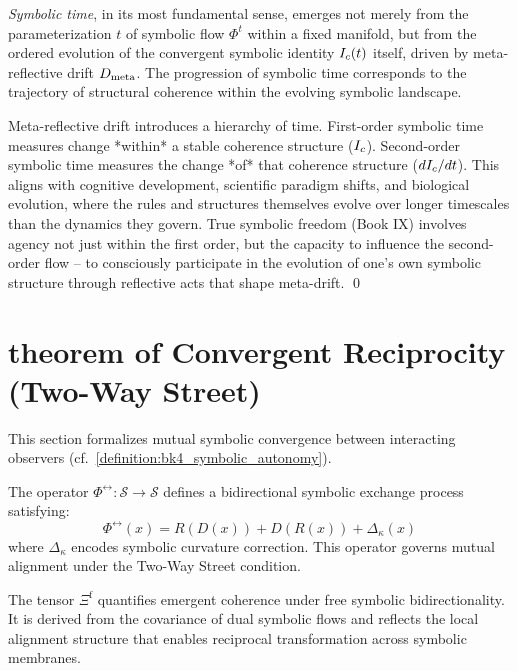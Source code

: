 \begin{definition}
\label{definition:bk7_symbolic_time_as_structural_evolution}
\emph{Symbolic time}, in its most fundamental sense, emerges not merely from the parameterization \(t\) of symbolic flow \(\Phi^t\) within a fixed manifold, but from the ordered evolution of the convergent symbolic identity \(I_c(t)\) itself, driven by meta-reflective drift \(D_{\mathrm{meta}}\). The progression of symbolic time corresponds to the trajectory of structural coherence within the evolving symbolic landscape.
\end{definition}
\begin{scholium}

\label{scholium:bk7_unnamed_scholium_02}Meta-reflective drift introduces a hierarchy of time. First-order symbolic time measures change *within* a stable coherence structure (\(I_c\)). Second-order symbolic time measures the change *of* that coherence structure (\(dI_c/dt\)). This aligns with cognitive development, scientific paradigm shifts, and biological evolution, where the rules and structures themselves evolve over longer timescales than the dynamics they govern. True symbolic freedom (Book IX) involves agency not just within the first order, but the capacity to influence the second-order flow -- to consciously participate in the evolution of one's own symbolic structure through reflective acts that shape meta-drift. \qed \end{scholium}
\section{theorem of Convergent Reciprocity (Two-Way Street)}
\label{sec:bk7_theorem_of_convergent_reciprocity_two_way_street}
This section formalizes mutual symbolic convergence between interacting observers (cf.~\ref{definition:bk4_symbolic_autonomy}).
\begin{definition}
\label{definition:bk7_two_way_flow_operator_}
The operator \(\Phi^{\leftrightarrow} : \mathcal{S} \to \mathcal{S}\) defines a bidirectional symbolic exchange process satisfying:
\[
\Phi^{\leftrightarrow}(x) = R(D(x)) + D(R(x)) + \Delta_\kappa(x)
\]
where \(\Delta_\kappa\) encodes symbolic curvature correction. This operator governs mutual alignment under the Two-Way Street condition.
\end{definition}
\begin{definition}
\label{definition:bk7_symbolic_convergence_tensor_f}
The tensor \(\Xi^{\mathrm{f}}\) quantifies emergent coherence under free symbolic bidirectionality. It is derived from the covariance of dual symbolic flows and reflects the local alignment structure that enables reciprocal transformation across symbolic membranes.
\end{definition}
